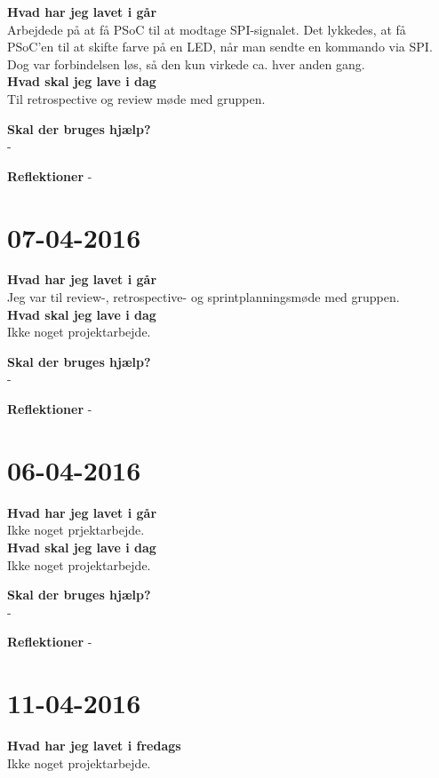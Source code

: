 \documentclass{article}
\begin{document}
	\textbf{Hvad har jeg lavet i går}\\
	Arbejdede på at få PSoC til at modtage SPI-signalet. Det lykkedes, at få PSoC'en til at skifte farve på en LED, når man sendte en kommando via SPI. Dog var forbindelsen løs, så den kun virkede ca. hver anden gang.\\
	
	\textbf{Hvad skal jeg lave i dag}\\
	Til retrospective og review møde med gruppen. 
	
	\textbf{Skal der bruges hjælp?}\\
	-
	
	\textbf{Reflektioner}
	-
	
	
	
	\section{07-04-2016}
	
	\textbf{Hvad har jeg lavet i går}\\
	Jeg var til review-, retrospective- og sprintplanningsmøde med gruppen.\\
	
	\textbf{Hvad skal jeg lave i dag}\\
	Ikke noget projektarbejde.
	
	\textbf{Skal der bruges hjælp?}\\
	-
	
	\textbf{Reflektioner}
	-
	
	
	
	\section{06-04-2016}
	
	\textbf{Hvad har jeg lavet i går}\\
	Ikke noget prjektarbejde.\\
	
	\textbf{Hvad skal jeg lave i dag}\\
	Ikke noget projektarbejde. 
	
	\textbf{Skal der bruges hjælp?}\\
	-
	
	\textbf{Reflektioner}
	-
	
	
	\section{11-04-2016}
	
	\textbf{Hvad har jeg lavet i fredags}\\
	Ikke noget projektarbejde.\\
	
\end{document}
